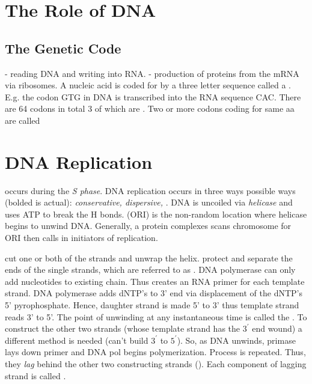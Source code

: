 \documentclass[../Bio_chemistryReview.tex]{subfiles}
\begin{document}
\section{The Role of DNA}

\subsection{The Genetic Code}

 - reading DNA and writing into RNA. 
- production of proteins from the mRNA via ribosomes. A nucleic acid is coded
for by a three letter sequence called a . E.g. the codon GTG in
DNA is transcribed into the RNA sequence CAC. There are 64 codons in total 3 of
which are . Two or more codons coding for same aa are called

\section{DNA Replication}

 occurs during the \emph{S phase}. DNA replication occurs in
three ways possible ways (bolded is actual): \emph{conservative, dispersive,
  }. DNA is uncoiled via \emph{helicase} and uses ATP
  to break the H bonds.  (ORI) is the non-random
  location where helicase begins to unwind DNA. Generally, a protein complexes
  scans chromosome for ORI then calls in initiators of replication.\par
   cut one or both of the strands and unwrap the helix.
   protect and separate the ends
  of the single strands, which are referred to as . DNA
  polymerase can only add nucleotides to existing chain. Thus 
  creates an RNA primer for each template strand. DNA polymerase adds dNTP's to
  3' end via displacement of the dNTP's 5' pyrophosphate. Hence, daughter strand
  is made 5' to 3' thus template strand reads 3' to 5'.  The point of unwinding
  at any instantaneous time is called the . To construct
  the other two strands (whose template strand has the $ 3^{\prime} $ end wound)
  a different method is needed (can't build $ 3^{\prime} $ to $ 5^{\prime} $).
  So, as DNA unwinds, primase lays down primer and DNA pol begins
  polymerization.  Process is repeated. Thus, they \emph{lag} behind the other
  two constructing strands (). Each component of lagging
  strand is called .
\end{document}
